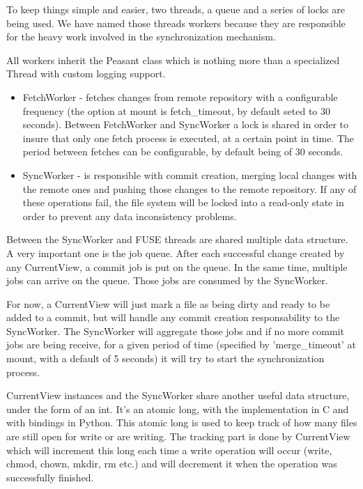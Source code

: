 To keep things simple and easier, two threads, a queue and a series of locks are being used. We have named those threads workers because they are responsible for the heavy work involved in the synchronization mechanism.

All workers inherit the Peasant class which is nothing more than a specialized Thread with custom logging support.
\begin{itemize}
    \item FetchWorker - fetches changes from remote repository with a configurable frequency (the option at mount is fetch\_timeout, by default seted to 30 seconds). Between FetchWorker and SyncWorker a lock is shared in order to insure that only one fetch process is executed, at a certain point in time. The period between fetches can be configurable, by default being of 30 seconds.
    \item SyncWorker - is responsible with commit creation, merging local changes with the remote ones and pushing those changes to the remote repository. If any of these operations fail, the file system will be locked into a read-only state in order to prevent any data inconsistency problems.
\end{itemize}

Between the SyncWorker and FUSE threads are shared multiple data structure. A very important one is the job queue. After each successful change created by any CurrentView, a commit job is put on the queue. In the same time, multiple jobs can arrive on the queue. Those jobs are consumed by the SyncWorker.

For now, a CurrentView will just mark a file as being dirty and ready to be added to a commit, but will handle any commit creation responsability to the SyncWorker. The SyncWorker will aggregate those jobs and if no more commit jobs are being receive, for a given period of time (specified by 'merge\_timeout' at mount, with a default of 5 seconds) it will try to start the synchronization process.

CurrentView instances and the SyncWorker share another useful data structure, under the form of an int. It's an atomic long, with the implementation in C and with bindings in Python. This atomic long is used to keep track of how many files are still open for write or are writing. The tracking part is done by CurrentView which will increment this long each time a write operation will occur (write, chmod, chown, mkdir, rm etc.) and will decrement it when the operation was successfully finished.

